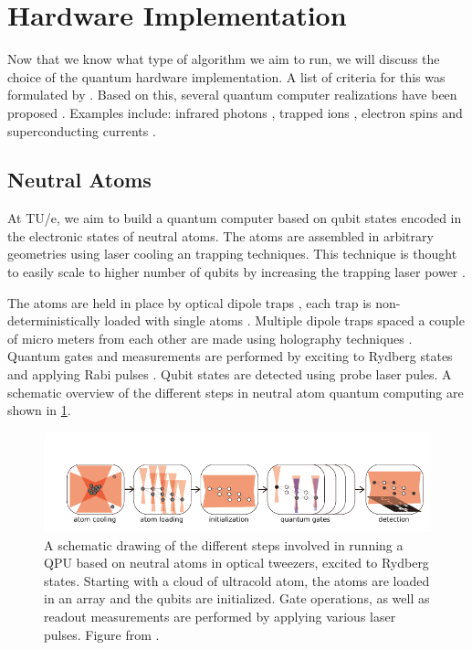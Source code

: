\section{Hardware Implementation}

Now that we know what type of algorithm we aim to run, we will discuss the choice of the quantum hardware implementation. A list of criteria for this was formulated by \cite{DiVincenzo2000}. Based on this, several quantum computer realizations have been proposed \cite{Ladd2010}. Examples include: infrared photons \cite{Matthews2009},  trapped ions \cite{Benhelm2008,Schindler2013}, electron spins \cite{Press2008} and superconducting currents \cite{DiCarlo2009,Arute2019}. 

\subsection{Neutral Atoms}

At TU/e, we aim to build a quantum computer based on qubit states encoded in the electronic states of neutral atoms. The atoms are assembled in arbitrary geometries using laser cooling an trapping techniques. This technique is thought to easily scale to higher number of qubits by increasing the trapping laser power \cite{Henriet2020}. 

The atoms are held in place by optical dipole traps \cite{Chu1986}, each trap is non-deterministically loaded with single atoms \cite{Schlosser2001}. Multiple dipole traps spaced a couple of micro meters from each other are made using holography techniques \cite{Bergamini2004}. Quantum gates and measurements are performed by exciting to Rydberg states and applying Rabi pulses \cite{Levine2018,Madjarov2020}. Qubit states are detected using probe laser pules. A schematic overview of the different steps in neutral atom quantum computing are shown in \cref{fig:ComputingSteps}.

\begin{figure}
	\centering
	\includegraphics[width=\linewidth]{figures/ComputingSteps.pdf}
	\caption{A schematic drawing of the different steps involved in running a QPU based on neutral atoms in optical tweezers, excited to Rydberg states. Starting with a cloud of ultracold atom, the atoms are loaded in an array and the qubits are initialized. Gate operations, as well as readout measurements are performed by applying various laser pulses. Figure from \cite{Wu2021}.}
	\label{fig:ComputingSteps}
\end{figure}

